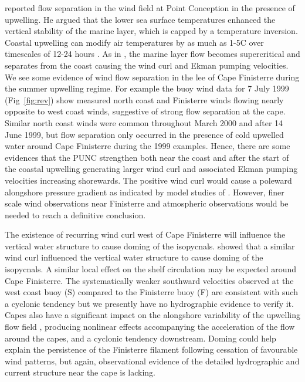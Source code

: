 \citet{Munchow00} reported flow separation in the wind field at
Point Conception in the presence of upwelling. He argued that the
lower sea surface temperatures enhanced the vertical stability of
the marine layer, which is capped by a temperature inversion.
Coastal upwelling can modify air temperatures by as much as
1-5\deg C over timescales of 12-24 hours \citep{Samelson02}. As in
\citet{Enriquez95}, the marine layer flow becomes supercritical
and separates from the coast causing the wind curl and Ekman
pumping velocities. We see some evidence of wind flow separation
in the lee of Cape Finisterre during the summer upwelling regime.
For example the buoy wind data for 7 July 1999 (Fig~\ref{fig:rev})
show measured north coast and Finisterre winds flowing nearly
opposite to west coast winds, suggestive of strong flow separation
at the cape. Similar north coast winds were common throughout
March 2000 and after 14 June 1999, but flow separation only
occurred in the presence of cold upwelled water around Cape
Finisterre during the 1999 examples. Hence, there are some
evidences that the PUNC strengthen both near the coast and after
the start of the coastal upwelling generating larger wind curl and
associated Ekman pumping velocities increasing shorewards. The
positive wind curl would cause a poleward alongshore pressure
gradient as indicated by model studies of \citet{Wang97}. However,
finer scale wind observations near Finisterre and atmospheric
observations would be needed to reach a definitive conclusion.

The existence of recurring wind curl west of Cape Finisterre will
influence the vertical water structure to cause doming of the
isopycnals. \citet{Munchow00} showed that a similar wind curl
influenced the vertical water structure to cause doming of the
isopycnals.  A similar local effect on the shelf circulation may
be expected around Cape Finisterre. The systematically weaker
southward velocities observed at the west coast buoy (S) compared
to the Finisterre buoy (F) are consistent with such a cyclonic
tendency but we presently have no hydrographic evidence to verify
it. Capes also have a significant impact on the alongshore
variability of the upwelling flow field
\citep{Crepon84,Dale01,Rosenfeld94}, producing nonlinear effects
accompanying the acceleration of the flow around the capes, and a
cyclonic tendency downstream. Doming could help explain the
persistence of the Finisterre filament following cessation of
favourable wind patterns, but again, observational evidence of the
detailed hydrographic and current structure near the cape is
lacking.


